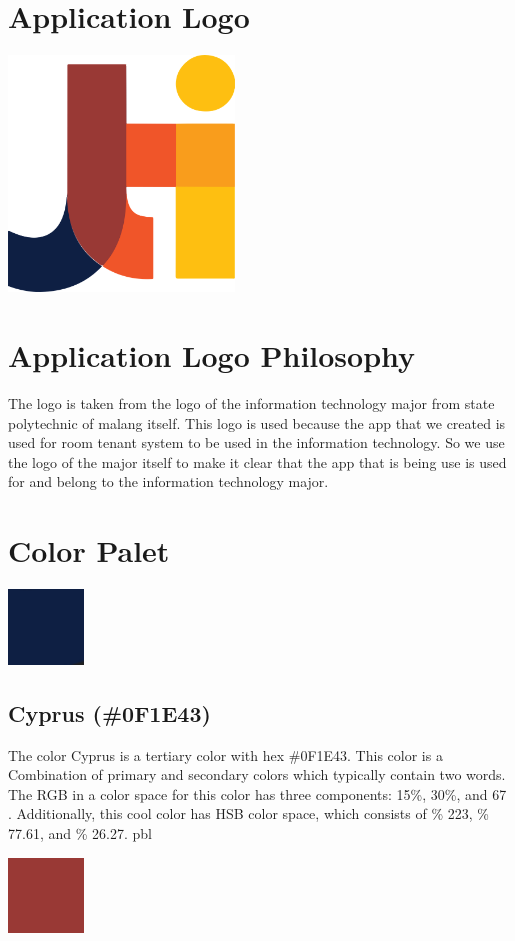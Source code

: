 \documentclass[12pt,titlepage,a4paper]{report}
\begin{document}
    \section{Application Logo}
    \begin{center}
        \includegraphics[width=6cm]{images/figures/UIUX/logo_jti_baru.png}
    \end{center}
    \section{Application Logo Philosophy}
    The logo is taken from the logo of the information technology major from state polytechnic of malang itself. This logo is used because the app that we created is used for room tenant system to be used in the information technology. So we use the logo of the major itself to make it clear that the app that is being use is used for and belong to the information technology major.
    \newpage
    \section{Color Palet}
    \begin{center}
        \includegraphics[width=2cm]{images/figures/UIUX/Untitled.png}
    \end{center}
    \subsection*{Cyprus (\#0F1E43)}
    The color Cyprus is a tertiary color with hex \#0F1E43. This color is a Combination of primary and secondary colors which typically contain two words. The RGB in a color space for this color has three components: 15\%, 30\%, and 67 . Additionally, this cool color has HSB color space, which consists of \% 223, \% 77.61, and \% 26.27. pbl
    \begin{center}
        \includegraphics[width=2cm]{images/figures/UIUX/Untitled 1.png}
    \end{center}
\end{document}
